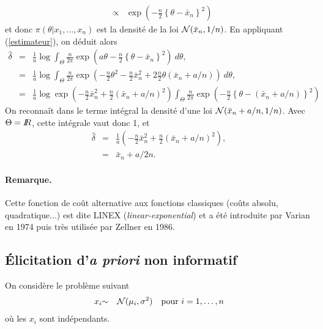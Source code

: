 \begin{enumerate}
\begin{eqnarray*}
 & \propto &  \exp\left(- \frac{n}{2}\left\{\theta - \bar{x}_n\right\}^2\right)
\end{eqnarray*}
et donc $\pi(\theta|x_1,\ldots,x_n)$ est la densité de la loi ${\cal{N}}(\bar{x}_n,1/n)$. En appliquant (\ref{estimateur}), on déduit alors 
\begin{eqnarray*}
\hat{\delta} & = & \frac{1}{a}\log  \int_{\Theta} \frac{n}{2\pi} \exp\left(a\theta -  \frac{n}{2}\left\{\theta - \bar{x}_n\right\}^2\right) \ d\theta, \\
 & = & \frac{1}{a}\log  \int_{\Theta} \frac{n}{2\pi} \exp\left(-\frac{n}{2}\theta^2 -  \frac{n}{2}\bar{x}^2_n + 2 \frac{n}{2}\theta (\bar{x}_n + a/n) \right) \ d\theta, \\
 & = & \frac{1}{a}\log  \exp\left (-  \frac{n}{2}\bar{x}^2_n + \frac{n}{2}(\bar{x}_n + a/n)^2\right)\int_{\Theta} \frac{n}{2\pi}  \exp\left(-\frac{n}{2} \left\{\theta - (\bar{x}_n + a/n)\right\}^2\right) 
\end{eqnarray*}
On reconnaît dans le terme intégral la densité d'une loi ${\cal{N}}(\bar{x}_n + a/n,1/n)$. Avec $\Theta=I\!\!R$, cette intégrale vaut donc 1, et 
\begin{eqnarray*}
\hat{\delta} & = & \frac{1}{a} \left (-  \frac{n}{2}\bar{x}^2_n + \frac{n}{2}(\bar{x}_n + a/n)^2\right), \\
& = & \bar{x}_n + a/2n.  
\end{eqnarray*}

\end{enumerate}

\paragraph{Remarque.} Cette fonction de coût alternative aux fonctions classiques (coûts absolu, quadratique...) est dite LINEX ({\it linear-exponential}) et a été introduite par Varian en 1974 puis très utilisée par Zellner en 1986.  

\subsection{\'Elicitation d'{\it a priori} non informatif }

On considère le problème suivant
\begin{eqnarray*}
x_i & {\sim} & {\cal{N}}(\mu_i,\sigma^2) \ \ \ \text{pour $i=1,\ldots,n$}
\end{eqnarray*}
où les $x_i$ sont indépendants. 

